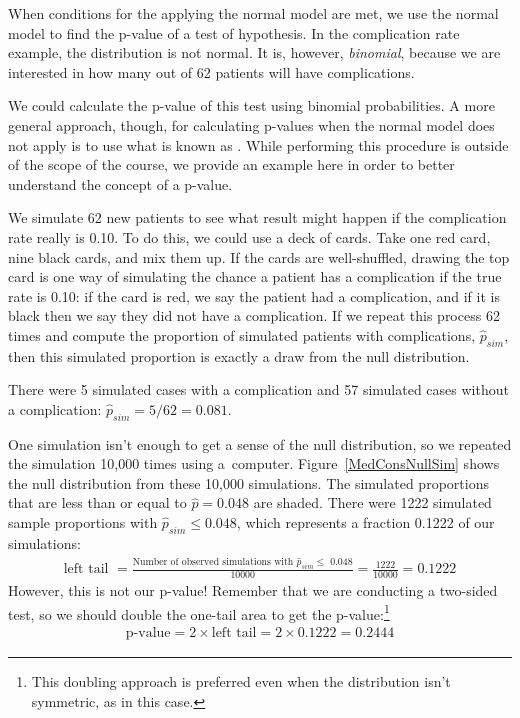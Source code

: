 When conditions for the applying the normal model are met, we use the normal model to find the p-value of a test of hypothesis. In the complication rate example, the distribution is not normal. It is, however, \emph{binomial}, because we are interested in how many out of 62 patients will have complications.

We could calculate the p-value of this test using binomial probabilities. A more general approach, though, for calculating p-values when the normal model does not apply is to use what is known as . While performing this procedure is outside of the scope of the course, we provide an example here in order to better understand the concept of a p-value.

We simulate 62 new patients to see what result might happen if the complication rate really is 0.10. To do this, we could use a deck of cards. Take one red card, nine black cards, and mix them up. If the cards are well-shuffled, drawing the top card is one way of simulating the chance a patient has a complication if the true rate is 0.10: if the card is red, we say the patient had a complication, and if it is black then we say they did not have a complication. If we repeat this process 62 times and compute the proportion of simulated patients with complications, $\hat{p}_{sim}$, then this simulated proportion is exactly a draw from the null distribution.

There were 5 simulated cases with a complication and 57 simulated cases without a complication: $\hat{p}_{sim} = 5/62 = 0.081$.

One simulation isn't enough to get a sense of the null distribution, so we repeated the simulation 10,000 times using a~computer. Figure~\ref{MedConsNullSim} shows the null distribution from these 10,000 simulations. The simulated proportions that are less than or equal to $\hat{p}=0.048$ are shaded. There were 1222 simulated sample proportions with $\hat{p}_{sim} \leq 0.048$, which represents a fraction 0.1222 of our simulations:
\begin{align*}
\text{left tail }
	= \frac{\text{Number of observed simulations with }\hat{p}_{sim}\leq\text{ 0.048}}{10000}
	= \frac{1222}{10000} = 0.1222
\end{align*}
However, this is not our p-value! Remember that we are conducting a two-sided test, so we should double the one-tail area to get the p-value:\footnote{This doubling approach is preferred even when the distribution isn't symmetric, as in this case.}
\begin{align*}
\text{p-value} = 2 \times \text{left tail} = 2 \times 0.1222 = 0.2444
\end{align*}

